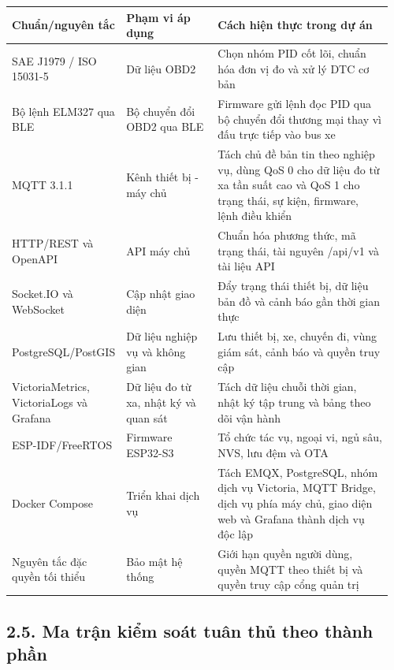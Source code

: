 \documentclass[a4paper]{extarticle}
\newcounter{none} %
\newcommand{\thesisterm}[1]{{\rmfamily #1}}
\begin{document}
{\def\LTcaptype{none} %
\begin{longtable}{|L{0.255\linewidth}|L{0.245\linewidth}|L{0.460\linewidth}|}
\hline
\textbf{Chuẩn/nguyên tắc} & \textbf{Phạm vi áp dụng} & \textbf{Cách hiện thực trong dự án} \\
\hline
\endhead
\endfoot
\endlastfoot
SAE J1979 / ISO 15031-5 & Dữ liệu OBD2 & Chọn nhóm PID cốt lõi, chuẩn hóa đơn vị đo và xử lý DTC cơ bản \\\hline
Bộ lệnh ELM327 qua BLE & Bộ chuyển đổi OBD2 qua BLE & Firmware gửi lệnh đọc PID qua bộ chuyển đổi thương mại thay vì đấu trực tiếp vào bus xe \\\hline
MQTT 3.1.1 & Kênh thiết bị - máy chủ & Tách chủ đề bản tin theo nghiệp vụ, dùng QoS 0 cho dữ liệu đo từ xa tần suất cao và QoS 1 cho trạng thái, sự kiện, firmware, lệnh điều khiển \\\hline
HTTP/REST và OpenAPI & API máy chủ & Chuẩn hóa phương thức, mã trạng thái, tài nguyên \thesisterm{/api/v1} và tài liệu API \\\hline
Socket.IO và WebSocket & Cập nhật giao diện & Đẩy trạng thái thiết bị, dữ liệu bản đồ và cảnh báo gần thời gian thực \\\hline
PostgreSQL/PostGIS & Dữ liệu nghiệp vụ và không gian & Lưu thiết bị, xe, chuyến đi, vùng giám sát, cảnh báo và quyền truy cập \\\hline
VictoriaMetrics, VictoriaLogs và Grafana & Dữ liệu đo từ xa, nhật ký và quan sát & Tách dữ liệu chuỗi thời gian, nhật ký tập trung và bảng theo dõi vận hành \\\hline
ESP-IDF/FreeRTOS & Firmware ESP32-S3 & Tổ chức tác vụ, ngoại vi, ngủ sâu, NVS, lưu đệm và OTA \\\hline
Docker Compose & Triển khai dịch vụ & Tách EMQX, PostgreSQL, nhóm dịch vụ Victoria, MQTT Bridge, dịch vụ phía máy chủ, giao diện web và Grafana thành dịch vụ độc lập \\\hline
Nguyên tắc đặc quyền tối thiểu & Bảo mật hệ thống & Giới hạn quyền người dùng, quyền MQTT theo thiết bị và quyền truy cập cổng quản trị \\\hline
\end{longtable}
}

\subsection{2.5. Ma trận kiểm soát tuân thủ theo thành phần}\label{app2-compliance-matrix-cap-nhat}
\end{document}
